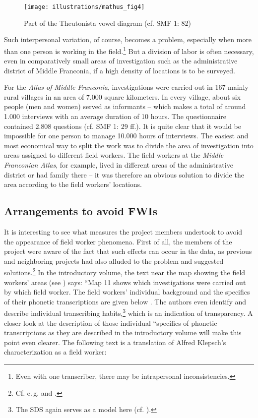 \documentclass[output=paper]{LSP/langsci}
\begin{document}
\begin{figure}[t]
\texttt{[image: illustrations/mathus\_fig4]}
\caption{Part of the Theutonista vowel diagram (cf. SMF 1: 82)}
\label{fig:mathus:4}
\end{figure}

Such interpersonal variation, of course, becomes a problem, especially when more than one person is working in the field.\footnote{Even with one transcriber, there may be intrapersonal inconsistencies.} But a division of labor is often necessary, even in comparatively small areas of investigation such as the administrative district of Middle Franconia, if a high density of locations is to be surveyed.

For the \textit{Atlas of Middle Franconia}, investigations were carried out in 167 mainly rural villages in an area of 7.000 square kilometers. In every village, about six people (men and women) served as informants – which makes a total of around 1.000 interviews with an average duration of 10 hours. The questionnaire contained 2.808 questions (cf. SMF 1: 29 ff.). It is quite clear that it would be impossible for one person to manage 10.000 hours of interviews. The easiest and most economical way to split the work was to divide the area of investigation into areas assigned to different field workers. The field workers at the \textit{Middle Franconian Atlas}, for example, lived in different areas of the administrative district or had family there – it was therefore an obvious solution to divide the area according to the field workers' locations.

\subsection{Arrangements to avoid FWIs}
It is interesting to see what measures the project members undertook to avoid the appearance of field worker phenomena. First of all, the members of the project were aware of the fact that such effects can occur in the data, as previous and neighboring projects had also alluded to the problem and suggested solutions.\footnote{Cf. e.\,g. \citet[59]{hotzenkocherle_einfuhrung_1962} and \citet[45]{konig_sprachatlas_1997}.} In the introductory volume, the text near the map showing the field workers' areas (see ) says: ``Map 11 shows which investigations were carried out by which field worker. The field workers' individual background and the specifics of their phonetic transcriptions are given below{\textquotedbl} \citep[47]{klepsch_sprachatlas_2013}. The authors even identify and describe individual transcribing habits,\footnote{The SDS again serves as a model here (cf. \citealt[61--73]{hotzenkocherle_einfuhrung_1962}).} which is an indication of transparency. A closer look at the description of those individual ``specifics of phonetic transcriptions{\textquotedbl} as they are described in the introductory volume will make this point even clearer. The following text is a translation of Alfred Klepsch's characterization as a field worker:
\end{document}
